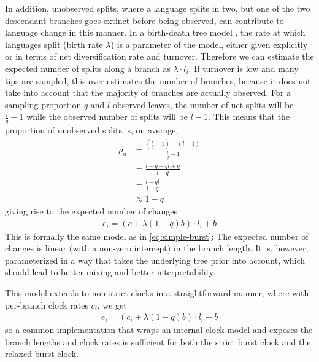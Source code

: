 \documentclass[a4paper,12pt]{scrartcl}
\begin{document}
%

In addition, unobserved splits, where a language splits in two, but one of
the two descendant branches goes extinct before being observed, can contribute
to language change in this manner. In a birth-death tree model \parencite{}, the rate at which
languages split (birth rate $\lambda$) is a parameter of the model, either given explicitly or in terms of net diversification rate and turnover. Therefore
we can estimate the expected number of splits along a branch as $\lambda \cdot
l_i$. If turnover is low and many tips are sampled, this over-estimates the number of branches, because it does not take into account that the majority of branches are actually observed. For a sampling proportion $q$ and $l$ observed leaves, the number of net splits will be
$\frac{l}{q} - 1$
while the observed number of splits will be $l - 1$. This means that the proportion of unobserved splits is, on average,
\begin{align}
    \rho_u &= \frac{(\frac{l}{q} - 1) - (l - 1)}{\frac{l}{q} -1} \\
    & = \frac{l - q - ql + q}{l - q} \\
    & = \frac{l - ql}{l - q} \\
    & \approx 1 - q
\end{align}
giving rise to the expected number of changes
\begin{align}
  e_i = (c + \lambda (1-q) b) \cdot l_i + b
  \label{eq:reparam-burst}
\end{align}
This is formally the same model as in \cref{eq:simple-burst}: The expected number of changes is linear (with a non-zero intercept) in the branch length. It is, however, parameterized
in a way that takes the underlying tree prior into account,
which should lead to better mixing and better interpretability.

This model extends to non-strict clocks in a straightforward manner, where with per-branch clock rates $c_i$, we get
\begin{align}
  e_i = (c_i + \lambda (1-q) b) \cdot l_i + b
  \label{eq:relaxed}
\end{align}
so a common implementation that wraps an internal clock model and exposes the branch lengths and clock rates is sufficient for
both the strict burst clock and the relaxed burst clock.
\end{document}
